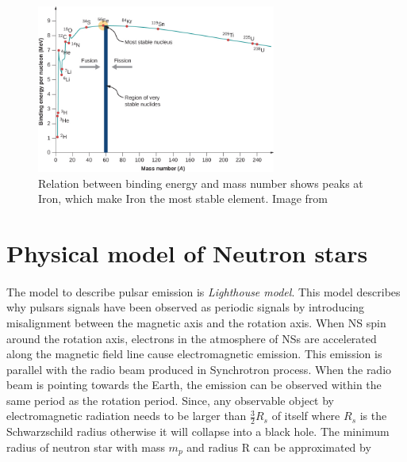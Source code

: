 \documentclass[thesis_msc.tex]{subfiles}
\begin{document}
    \begin{figure}[h] \centering
\includegraphics[width=0.70\textwidth]{figures/binding.jpg}
\caption{Relation between binding energy and mass number shows peaks at Iron, which make Iron the most stable element. Image from \cite{urone_hinrichs_dirks_sharma_2018} }

\label{binding}
\end{figure}
\newpage
\section{Physical model of Neutron stars} \label{phys}
    \paragraph{} The model to describe pulsar emission is  \textit{Lighthouse model}. This model describes why pulsars signals have been observed as periodic signals by introducing misalignment between the magnetic axis and the rotation axis. When NS spin around the rotation axis, electrons in the atmosphere of NSs are accelerated along the magnetic field line cause electromagnetic emission. This emission is parallel with the radio beam produced in Synchrotron process. When the radio beam is pointing towards the Earth, the emission can be observed within the same period as the rotation period. Since, any observable object by electromagnetic radiation needs to be larger than $\frac{3}{2} R_s$ of itself where $R_s$ is the Schwarzschild radius otherwise it will collapse into a black hole. The minimum radius of neutron star with mass $m_p$ and radius R  can be approximated by 
\end{document}

